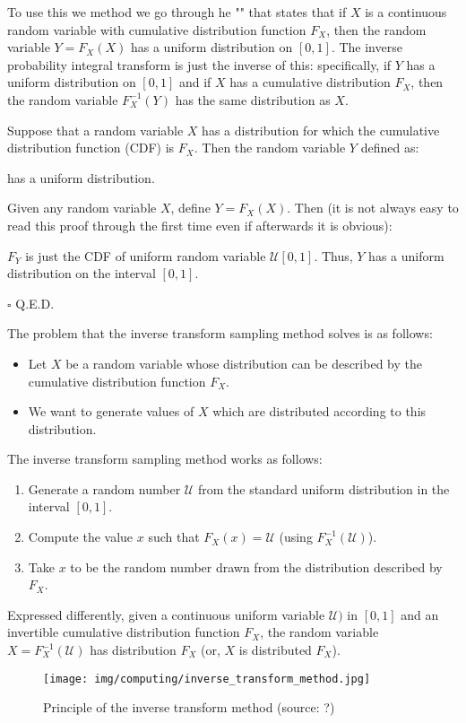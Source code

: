 	To use this we method we go through he "" that states that if $X$ is a continuous random variable with cumulative distribution function $F_X$, then the random variable $Y=F_X(X)$ has a uniform distribution on $[0, 1]$. The inverse probability integral transform is just the inverse of this: specifically, if $Y$ has a uniform distribution on $[0, 1]$ and if $X$ has a cumulative distribution $F_X$, then the random variable $F_X^{-1}(Y)$ has the same distribution as $X$.
	\begin{theorem}
	Suppose that a random variable $X$ has a distribution for which the cumulative distribution function (CDF) is $F_X$. Then the random variable $Y$ defined as:
	
	has a uniform distribution.
	\end{theorem}
	\begin{dem}
	Given any random variable $X$, define $Y = F_X (X)$. Then (it is not always easy to read this proof through the first time even if afterwards it is obvious):
	
	$F_Y$ is just the CDF of uniform random variable $\mathcal{U}[0,1]$. Thus, $Y$ has a uniform distribution on the interval $[0, 1]$.
	\begin{flushright}
		$\square$  Q.E.D.
	\end{flushright}
	\end{dem}
	The problem that the inverse transform sampling method solves is as follows:
	\begin{itemize}
		\item Let $X$ be a random variable whose distribution can be described by the cumulative distribution function $F_X$.
		\item We want to generate values of $X$ which are distributed according to this distribution.
	\end{itemize}
The inverse transform sampling method works as follows:
	\begin{enumerate}
		\item Generate a random number $\mathcal{U}$ from the standard uniform distribution in the interval $[0,1]$.
		\item Compute the value $x$ such that $F_X(x) =\mathcal{U}$ (using $F_X^{-1}(\mathcal{U})$).
		\item Take $x$ to be the random number drawn from the distribution described by $F_X$.
	\end{enumerate}
Expressed differently, given a continuous uniform variable $\mathcal{U})$ in $[0, 1]$ and an invertible cumulative distribution function $F_X$, the random variable $X = F_X^{-1}(\mathcal{U})$ has distribution $F_X$ (or, $X$ is distributed $F_X$).
	\begin{figure}[H]
		\centering
		\texttt{[image: img/computing/inverse\_transform\_method.jpg]}
		\caption[Principle of the inverse transform method]{Principle of the inverse transform method (source: ?)}
	\end{figure}
	
